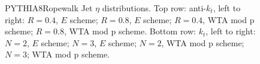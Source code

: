 \begin{figure}[H]
\hfill
{}\hfill
\caption{PYTHIA8Ropewalk Jet $\eta$ distributions. Top row: anti-$k_t$, left to right: $R=0.4$, $E$ scheme; $R=0.8$, $E$ scheme; $R=0.4$, WTA mod p scheme; $R=0.8$, WTA mod p scheme. Bottom row: $k_t$, left to right: $N=2$, $E$ scheme; $N=3$, $E$ scheme; $N=2$, WTA mod p scheme; $N=3$; WTA mod p scheme.}  
\end{figure}

